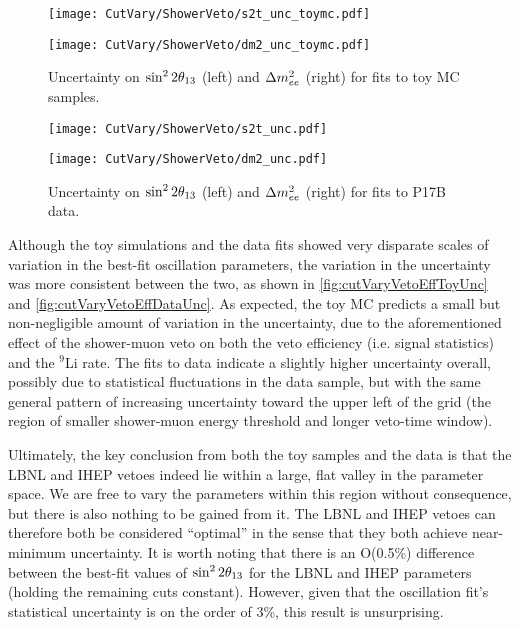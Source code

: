 \documentclass[../thesis.tex]{subfiles}
\begin{document}
\begin{figure}[ht]
  \begin{minipage}{0.5\linewidth}%
    \texttt{[image: CutVary/ShowerVeto/s2t\_unc\_toymc.pdf]}%
  \end{minipage}%
  \begin{minipage}{0.5\linewidth}%
    \texttt{[image: CutVary/ShowerVeto/dm2\_unc\_toymc.pdf]}%
  \end{minipage}%
  \caption{Uncertainty on $\sin^2 2\theta_{13}$ (left) and $\Delta m^2_{ee}$ (right) for fits to toy MC samples.}
  \label{fig:cutVaryVetoEffToyUnc}
\end{figure}

\begin{figure}[ht]
  \begin{minipage}{0.5\linewidth}%
    \texttt{[image: CutVary/ShowerVeto/s2t\_unc.pdf]}%
  \end{minipage}%
  \begin{minipage}{0.5\linewidth}%
    \texttt{[image: CutVary/ShowerVeto/dm2\_unc.pdf]}%
  \end{minipage}%
  \caption{Uncertainty on $\sin^2 2\theta_{13}$ (left) and $\Delta m^2_{ee}$ (right) for fits to P17B data.}
  \label{fig:cutVaryVetoEffDataUnc}
\end{figure}

Although the toy simulations and the data fits showed very disparate scales of variation in the best-fit oscillation parameters, the variation in the uncertainty was more consistent between the two, as shown in \autoref{fig:cutVaryVetoEffToyUnc} and \autoref{fig:cutVaryVetoEffDataUnc}. As expected, the toy MC predicts a small but non-negligible amount of variation in the uncertainty, due to the aforementioned effect of the shower-muon veto on both the veto efficiency (i.e. signal statistics) and the $^9$Li rate. The fits to data indicate a slightly higher uncertainty overall, possibly due to statistical fluctuations in the data sample, but with the same general pattern of increasing uncertainty toward the upper left of the grid (the region of smaller shower-muon energy threshold and longer veto-time window).

Ultimately, the key conclusion from both the toy samples and the data is that the LBNL and IHEP vetoes indeed lie within a large, flat valley in the parameter space. We are free to vary the parameters within this region without consequence, but there is also nothing to be gained from it. The LBNL and IHEP vetoes can therefore both be considered ``optimal'' in the sense that they both achieve near-minimum uncertainty. It is worth noting that there is an O(0.5\%) difference between the best-fit values of $\sin^2 2\theta_{13}$ for the LBNL and IHEP parameters (holding the remaining cuts constant). However, given that the oscillation fit's statistical uncertainty is on the order of 3\%, this result is unsurprising.
\end{document}
